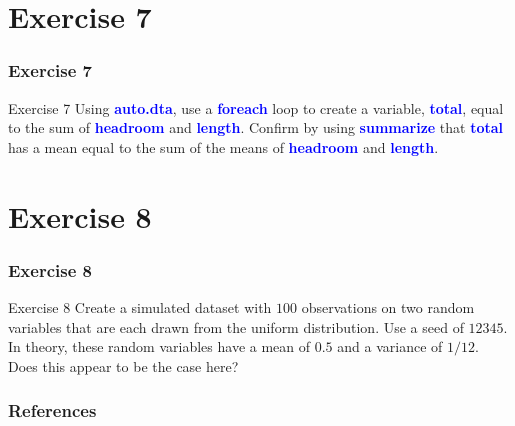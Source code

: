 \documentclass[11pt, aspectratio=169]{beamer}
\begin{document}
	\section{Exercise 7}
		\begin{frame}
			\frametitle{Exercise 7}
			\begin{block}{Exercise 7}
				Using \textcolor{blue}{\textbf{auto.dta}}, use a \textcolor{blue}{\textbf{foreach}} loop to create a variable, \textcolor{blue}{\textbf{total}}, equal
				to the sum of \textcolor{blue}{\textbf{headroom}} and \textcolor{blue}{\textbf{length}}. Confirm by using \textcolor{blue}{\textbf{summarize}} that
				\textcolor{blue}{\textbf{total}} has a mean equal to the sum of the means of \textcolor{blue}{\textbf{headroom}} and \textcolor{blue}{\textbf{length}}.
			\end{block}
		\end{frame}
	\section{Exercise 8}
		\begin{frame}
			\frametitle{Exercise 8}
			\begin{block}{Exercise 8}
				Create a simulated dataset with $100$ observations on two random
				variables that are each drawn from the uniform distribution. Use a seed
				of $12345$. In theory, these random variables have a mean of $0.5$ and a
				variance of $1/12$. Does this appear to be the case here? 
			\end{block}
		\end{frame}
	\begin{frame}[t,allowframebreaks]
		\frametitle{References}
		
		
		\nocite{cameron2022-I}
		\nocite{cameron2022-II}
	\end{frame}
	\begin{frame}
		\maketitle
	\end{frame}
\end{document}
